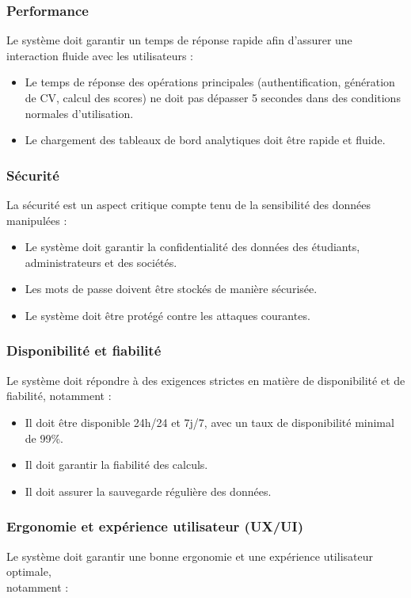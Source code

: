 \subsubsection{Performance}
Le système doit garantir un temps de réponse rapide afin d'assurer une interaction fluide avec les utilisateurs :

\begin{itemize}
  \item Le temps de réponse des opérations principales (authentification, génération de CV, calcul des scores) ne doit pas dépasser 5 secondes dans des conditions normales d'utilisation.
  \item Le chargement des tableaux de bord analytiques doit être rapide et fluide.
\end{itemize}

\subsubsection{Sécurité}
La sécurité est un aspect critique compte tenu de la sensibilité des données manipulées :

\begin{itemize}
  \item Le système doit garantir la confidentialité des données des étudiants, administrateurs et des sociétés.
  \item Les mots de passe doivent être stockés de manière sécurisée.
  \item Le système doit être protégé contre les attaques courantes.
\end{itemize}

\subsubsection{Disponibilité et fiabilité}
Le système doit répondre à des exigences strictes en matière de disponibilité et de fiabilité, notamment :

\begin{itemize}
  \item Il doit être disponible 24h/24 et 7j/7, avec un taux de disponibilité minimal de 99\%.
  \item Il doit garantir la fiabilité des calculs.
  \item Il doit assurer la sauvegarde régulière des données.
\end{itemize}

\subsubsection{Ergonomie et expérience utilisateur (UX/UI)}
Le système doit garantir une bonne ergonomie et une expérience utilisateur optimale,\\notamment :

